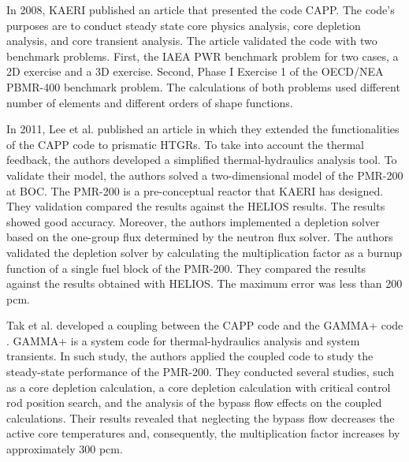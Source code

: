 \documentclass[11pt,letterpaper]{article}
\begin{document}
In 2008, \gls{KAERI} published an article \cite{lee_development_2008} that presented the code CAPP.
The code's purposes are to conduct steady state core physics analysis, core depletion analysis, and core transient analysis.
The article validated the code with two benchmark problems.
First, the IAEA PWR benchmark problem for two cases, a 2D exercise and a 3D exercise.
Second, Phase I Exercise 1 of the OECD/NEA PBMR-400 benchmark problem.
The calculations of both problems used different number of elements and different orders of shape functions.

In 2011, Lee et al. published an article \cite{lee_development_2011} in which they extended the functionalities of the CAPP code to prismatic \glspl{HTGR}.
To take into account the thermal feedback, the authors developed a simplified thermal-hydraulics analysis tool.
To validate their model, the authors solved a two-dimensional model of the PMR-200 at \gls{BOC}.
The PMR-200 is a pre-conceptual reactor that \gls{KAERI} has designed.
They validation compared the results against the HELIOS\cite{stammler_helios_1998} results.
The results showed good accuracy.
Moreover, the authors implemented a depletion solver based on the one-group flux determined by the neutron flux solver.
The authors validated the depletion solver by calculating the multiplication factor as a burnup function of a single fuel block of the PMR-200.
They compared the results against the results obtained with HELIOS.
The maximum error was less than 200 pcm.

Tak et al. \cite{tak_cappgamma_2016} developed a coupling between the CAPP code and the GAMMA+ code \cite{lim_gamma_2006}.
GAMMA+ is a system code for thermal-hydraulics analysis and system transients.
In such study, the authors applied the coupled code to study the steady-state performance of the PMR-200.
They conducted several studies, such as a core depletion calculation, a core depletion calculation with critical control rod position search, and the analysis of the bypass flow effects on the coupled calculations.
Their results revealed that neglecting the bypass flow decreases the active core temperatures and, consequently, the multiplication factor increases by approximately 300 pcm.
\end{document}
